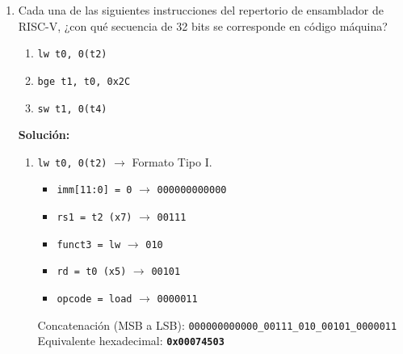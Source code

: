 \documentclass[letterpaper,12pt]{article}
\begin{document}
\begin{enumerate}
\begin{verbatim}
        addi s1, zero, 5 # n = 5
        addi s2, zero, 1 # fant = 1
        addi s3, zero, 1 # f = 1
        addi s4, zero, 2 # i = 2
        
        sw s1, 0(t0)
        sw s2, 0(t1)
        sw s3, 0(t2)
        sw s4, 0(t3)

    while:
        blt s1, s4, end  # Si n < i (equivalente a i > n), salir
        add t4, zero, s3 # faux = f
        add s3, s3, s2   # f = f + fant
        sw s3, 0(t2)     # Guardar f en memoria
        add s2, zero, t4 # fant = faux
        sw s2, 0(t1)     # Guardar fant en memoria
        addi s4, s4, 1   # i = i + 1 (Nota: usamos 'addi' para sumar inmediatos)
        sw s4, 0(t3)     # Guardar i en memoria
        j while

    end:
        j .
    \end{verbatim}
    \color{black}

    \vspace{0.5cm}

    \item Cada una de las siguientes instrucciones del repertorio de ensamblador de RISC-V, ¿con qué secuencia de 32 bits se corresponde en código máquina?
    \begin{enumerate}[label=\alph*)]
        \item \texttt{lw t0, 0(t2)}
        \item \texttt{bge t1, t0, 0x2C}
        \item \texttt{sw t1, 0(t4)}
    \end{enumerate}

    \color{solcolor}
    \textbf{Solución:}
    \begin{enumerate}[label=\alph*)]
        \item \texttt{lw t0, 0(t2)} $\rightarrow$ Formato Tipo I.
        \begin{itemize}[noitemsep]
            \item \texttt{imm[11:0] = 0} $\rightarrow$ \texttt{000000000000}
            \item \texttt{rs1 = t2 (x7)} $\rightarrow$ \texttt{00111}
            \item \texttt{funct3 = lw} $\rightarrow$ \texttt{010}
            \item \texttt{rd = t0 (x5)} $\rightarrow$ \texttt{00101}
            \item \texttt{opcode = load} $\rightarrow$ \texttt{0000011}
        \end{itemize}
        Concatenación (MSB a LSB): \texttt{000000000000\_00111\_010\_00101\_0000011} \\
        Equivalente hexadecimal: \textbf{\texttt{0x00074503}}
        

\end{enumerate}
\end{enumerate}
\end{document}
